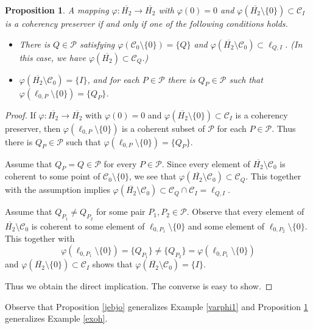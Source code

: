 \documentclass[10pt]{amsart}
\newtheorem{proposition}[theorem]{Proposition}
\theoremstyle{definition}
\theoremstyle{remark}
\numberwithin{subsection}{section}
\numberwithin{equation}{section}
\newcommand\cC{{\mathcal{C}}}
\newcommand\cP{{\mathcal{P}}}
\newcommand\oH{{\overline{H_2}}}
\begin{document}
\begin{proposition}\label{oHoH}
A mapping $\varphi\colon \oH\to \oH$ with $\varphi(0)=0$ and $\varphi(\oH\setminus \{0\})\subset\mathcal{C}_I$ is a coherency preserver if and only if one of the following conditions holds. 
\begin{itemize}
\item There is $Q\in \cP$ satisfying $\varphi(\mathcal{C}_0\setminus\{0\})= \{Q\}$ and $\varphi(\oH\setminus \mathcal{C}_0)\subset \ell_{Q,I}$.
(In this case, we have $\varphi(\oH)\subset \cC_Q$.)
\item $\varphi(\oH\setminus\mathcal{C}_0)=\{I\}$, and for each $P\in \mathcal{P}$ there is $Q_P \in \cP$ such that $\varphi(\ell_{0, P}\setminus\{0\})= \{Q_P\}$.
\end{itemize}
\end{proposition}
\begin{proof}
If $\varphi\colon \oH\to \oH$ with $\varphi(0)=0$ and $\varphi(\oH\setminus \{0\})\subset\mathcal{C}_I$ is a coherency preserver, then $\varphi(\ell_{0, P}\setminus\{0\})$ is a coherent subset of $\cP$ for each $P\in \mathcal{P}$. Thus there is $Q_P\in \cP$ such that $\varphi(\ell_{0, P}\setminus\{0\})= \{Q_P\}$.

Assume that $Q_P=Q\in \cP$ for every $P\in \cP$. 
Since every element of $\oH\setminus \mathcal{C}_0$ is coherent to some point of $\cC_0\setminus\{0\}$, we see that $\varphi(\oH\setminus \mathcal{C}_0)\subset \mathcal{C}_Q$. This together with the assumption implies $\varphi(\oH\setminus \mathcal{C}_0)\subset \mathcal{C}_Q\cap \mathcal{C}_I =\ell_{Q,I}$.

Assume that $Q_{P_1}\neq Q_{P_2}$ for some pair $P_1, P_2\in \cP$. 
Observe that every element of $\oH\setminus \cC_0$ is coherent to some element of $\ell_{0,P_1}\setminus\{0\}$ and some element of $\ell_{0,P_2}\setminus\{0\}$. 
This together with 
\[
\varphi(\ell_{0, P_1}\setminus\{0\})= \{Q_{P_1}\}\neq \{Q_{P_2}\}=\varphi(\ell_{0, P_1}\setminus\{0\})
\]
and $\varphi(\oH\setminus \{0\})\subset\mathcal{C}_I$ shows that $\varphi(\oH\setminus\mathcal{C}_0)=\{I\}$. 

Thus we obtain the direct implication. The converse is easy to show.
\end{proof}

Observe that Proposition \ref{jebjo} generalizes Example \ref{varphi1}
and Proposition \ref{oHoH} generalizes Example \ref{exoh}.
\end{document}
